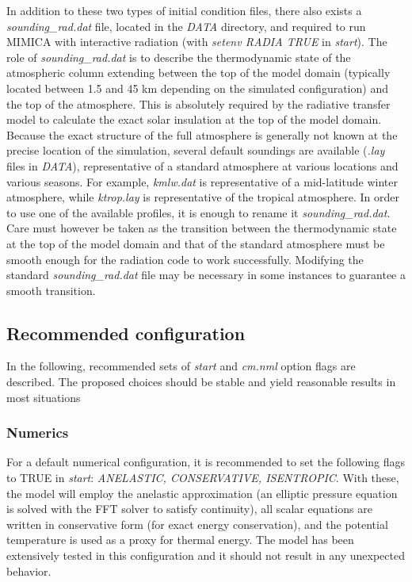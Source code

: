 \documentclass[12pt,A4,french]{article}
\begin{document}
In addition to these two types of initial condition files, there also exists a {\it sounding\_rad.dat} file, located in the {\it DATA} directory, and required to run MIMICA with interactive radiation (with {\it setenv RADIA TRUE} in {\it start}). The role of {\it sounding\_rad.dat} is to describe the thermodynamic state of the atmospheric column extending between the top of the model domain (typically located between 1.5 and 45 km depending on the simulated configuration) and the top of the atmosphere. This is absolutely required by the radiative transfer model to calculate the exact solar insulation at the top of the model domain. Because the exact structure of the full atmosphere is generally not known at the precise location of the simulation, several default soundings are available ({\it .lay} files in {\it DATA}), representative of a standard atmosphere at various locations and various seasons. For example, {\it kmlw.dat} is representative of a mid-latitude winter atmosphere, while {\it ktrop.lay} is representative of the tropical atmosphere. In order to use one of the available profiles, it is enough to rename it {\it sounding\_rad.dat}. Care must however be taken as the transition between the thermodynamic state at the top of the model domain and that of the standard atmosphere must be smooth enough for the radiation code to work successfully. Modifying the standard {\it sounding\_rad.dat} file may be necessary in some instances to guarantee a smooth transition. 

\subsection{Recommended configuration}

In the following, recommended sets of {\it start} and {\it cm.nml} option flags are described. The proposed choices should be stable and yield reasonable results in most situations

\subsubsection{Numerics}

For a default numerical configuration, it is recommended to set the following flags to TRUE in {\it start}: {\it ANELASTIC, CONSERVATIVE, ISENTROPIC}. With these, the model will employ the anelastic approximation (an elliptic pressure equation is solved with the FFT solver to satisfy continuity), all scalar equations are written in conservative form (for exact energy conservation), and the potential temperature is used as a proxy for thermal energy. The model has been extensively tested in this configuration and it should not result in any unexpected behavior.
\end{document}

